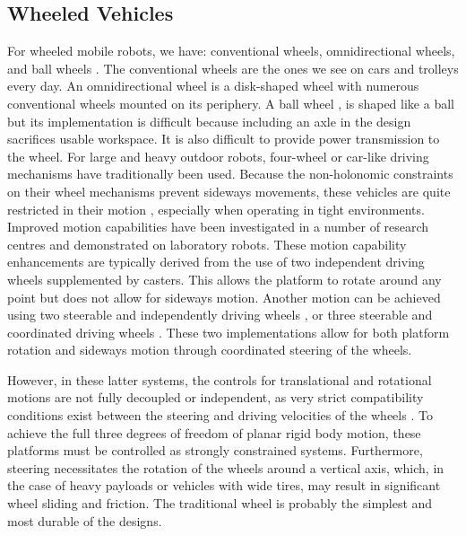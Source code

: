 \subsection{Wheeled Vehicles}
For wheeled mobile robots, we have: conventional wheels, omnidirectional wheels, and ball wheels \cite{muir_kinematic_1987}. The conventional wheels are the ones we see on cars and trolleys every day. An omnidirectional wheel is a disk-shaped wheel with numerous conventional wheels mounted on its periphery. A ball wheel \cite{ostrovskaya_dynamics_2000,west_design_1995}, is shaped like a ball but its implementation is difficult because including an axle in the design sacrifices usable workspace. It is also difficult to provide power transmission to the wheel. For large and heavy outdoor robots, four-wheel or car-like driving mechanisms have traditionally been used. Because the non-holonomic constraints on their wheel mechanisms prevent sideways movements, these vehicles are quite restricted in their motion \cite{laumond_feasible_1986, pin_autonomous_1990, noauthor_navigation_nodate}, especially when operating in tight environments. Improved motion capabilities have been investigated in a number of research centres and demonstrated on laboratory robots. These motion capability enhancements are typically derived from the use of two independent driving wheels supplemented by casters. This allows the platform to rotate around any point but does not allow for sideways motion. Another motion can be achieved using two steerable and independently driving wheels \cite{pin_autonomous_1989}, or three steerable and coordinated driving wheels \cite{pin_autonomous_1989}. These two implementations allow for both platform rotation and sideways motion through coordinated steering of the wheels.
\par
However, in these latter systems, the controls for translational and rotational motions are not fully decoupled or independent, as very strict compatibility conditions exist between the steering and driving velocities of the wheels \cite{alexander_kinematics_1989}. To achieve the full three degrees of freedom of planar rigid body motion, these platforms must be controlled as strongly constrained systems. Furthermore, steering necessitates the rotation of the wheels around a vertical axis, which, in the case of heavy payloads or vehicles with wide tires, may result in significant wheel sliding and friction. The traditional wheel is probably the simplest and most durable of the designs.
\par
